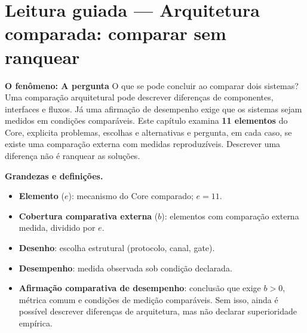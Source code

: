 

\section[Leitura guiada]{Leitura guiada — Arquitetura comparada: comparar sem ranquear}


\begin{descricao}
\textbf{O fenômeno: A pergunta}  O que se pode concluir ao comparar dois sistemas? Uma
comparação arquitetural pode descrever diferenças de componentes, interfaces e
fluxos. Já uma afirmação de desempenho exige que os sistemas sejam medidos em
condições comparáveis. Este capítulo examina \textbf{11 elementos} do Core,
explicita problemas, escolhas e alternativas e pergunta, em cada caso, se existe
uma comparação externa com medidas reproduzíveis. Descrever uma diferença não é
ranquear as soluções.
\end{descricao}

\begin{definicao}
\textbf{Grandezas e definições.}
\begin{itemize}[leftmargin=1.3em,itemsep=1pt]
  \item \textbf{Elemento} ($e$): mecanismo do Core comparado; $e = 11$.
  \item \textbf{Cobertura comparativa externa} ($b$): elementos com comparação externa medida, dividido por $e$.
  \item \textbf{Desenho}: escolha estrutural (protocolo, canal, gate).
  \item \textbf{Desempenho}: medida observada sob condição declarada.
  \item \textbf{Afirmação comparativa de desempenho}: conclusão que exige $b > 0$, métrica comum e condições de medição comparáveis. Sem isso, ainda é possível descrever diferenças de arquitetura, mas não declarar superioridade empírica.
\end{itemize}
\end{definicao}

